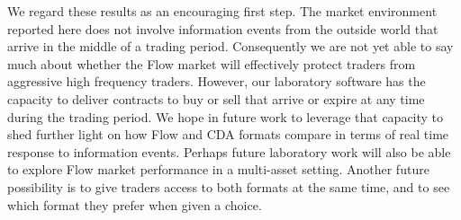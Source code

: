 \documentclass[12pt]{article}
\begin{document}
We regard these results as an encouraging first step.
The market environment reported here 
does not involve information events from the outside world that arrive 
in the middle of a trading period.
Consequently we are not yet able to say much about whether 
the Flow market will effectively protect traders from aggressive high frequency traders. 
However, our laboratory software has the capacity to deliver contracts to buy or sell that arrive or expire at any time during the trading period.
We hope in future work to leverage that capacity to shed further light on how Flow and CDA formats compare in terms of real time response to information events.
Perhaps future laboratory work will also be able to explore Flow market performance in a multi-asset setting.
Another future possibility is to give traders access to both formats at the same time, and to see which format they prefer when given a choice.










\pagebreak
\begin{singlespace}



\pagebreak
\end{singlespace}
\clearpage

\end{document}
